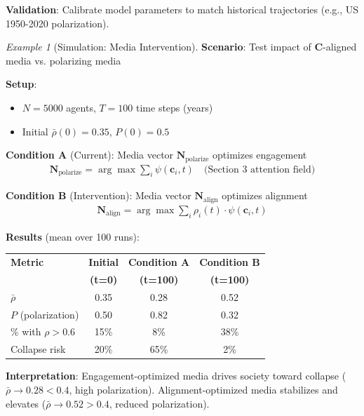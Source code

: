 \documentclass[11pt,a4paper]{article}
\theoremstyle{definition}
\theoremstyle{remark}
\newtheorem{example}{Example}[section]
\newcommand{\cc}{\mathbf{c}}
\begin{document}
\begin{enumerate}
\begin{protocol}
\textbf{Validation}: Calibrate model parameters to match historical trajectories (e.g., US 1950-2020 polarization).
\end{protocol}

\begin{example}[Simulation: Media Intervention]
\textbf{Scenario}: Test impact of \(\mathbf{C}\)-aligned media vs. polarizing media

\textbf{Setup}:
\begin{itemize}
    \item \(N = 5000\) agents, \(T = 100\) time steps (years)
    \item Initial \(\bar{\rho}(0) = 0.35\), \(P(0) = 0.5\)
\end{itemize}

\textbf{Condition A} (Current): Media vector \(\mathbf{N}_{\text{polarize}}\) optimizes engagement
\begin{align}
\mathbf{N}_{\text{polarize}} = \arg\max \sum_i \psi(\cc_i, t) \quad \text{(Section 3 attention field)}
\end{align}

\textbf{Condition B} (Intervention): Media vector \(\mathbf{N}_{\text{align}}\) optimizes alignment
\begin{align}
\mathbf{N}_{\text{align}} = \arg\max \sum_i \rho_i(t) \cdot \psi(\cc_i, t)
\end{align}

\textbf{Results} (mean over 100 runs):

\begin{table}[H]
\centering
\begin{tabular}{|l|c|c|c|}
\hline
\textbf{Metric} & \textbf{Initial} & \textbf{Condition A} & \textbf{Condition B} \\
& \textbf{(t=0)} & \textbf{(t=100)} & \textbf{(t=100)} \\
\hline
\(\bar{\rho}\) & 0.35 & 0.28 & 0.52 \\
\hline
\(P\) (polarization) & 0.50 & 0.82 & 0.32 \\
\hline
\% with \(\rho > 0.6\) & 15\% & 8\% & 38\% \\
\hline
Collapse risk & 20\% & 65\% & 2\% \\
\hline
\end{tabular}
\end{table}

\textbf{Interpretation}: Engagement-optimized media drives society toward collapse (\(\bar{\rho} \to 0.28 < 0.4\), high polarization). Alignment-optimized media stabilizes and elevates (\(\bar{\rho} \to 0.52 > 0.4\), reduced polarization).


\end{example}
\end{enumerate}
\end{document}
